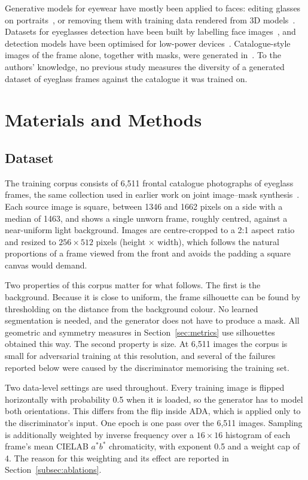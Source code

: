 \documentclass[electronics,article,submit,pdftex,moreauthors]{Definitions/mdpi}
\begin{document}
Generative models for eyewear have mostly been applied to faces: editing
glasses on portraits~\cite{plesh2023glassesgan}, or removing them with
training data rendered from 3D models~\cite{lyu2022portrait}. Datasets for
eyeglasses detection have been built by labelling face
images~\cite{matuzevicius2024diverse,matuzevicius2024retrospective}, and
detection models have been optimised for low-power
devices~\cite{giedra2025deploying}. Catalogue-style images of the frame
alone, together with masks, were generated
in~\cite{shubitidze2026masks}. To the authors' knowledge, no previous study
measures the diversity of a generated dataset of eyeglass frames against the
catalogue it was trained on.


\section{Materials and Methods}
\label{sec:methods}

\subsection{Dataset}
\label{subsec:data}

The training corpus consists of 6,511 frontal catalogue photographs of
eyeglass frames, the same collection used in earlier work on joint
image--mask synthesis~\cite{shubitidze2026masks}. Each source image is square,
between 1346 and 1662 pixels on a side with a median of 1463, and
shows a single unworn frame, roughly centred, against a near-uniform light
background. Images are centre-cropped
to a 2:1 aspect ratio and resized to $256 \times 512$ pixels (height $\times$
width), which follows the natural proportions of a frame viewed from the
front and avoids the padding a square canvas would demand.

Two properties of this corpus matter for what follows. The first is the
background. Because it is close to uniform, the frame silhouette can be found
by thresholding on the distance from the background colour. No learned
segmentation is needed, and the generator does not have to produce a mask.
All geometric and symmetry measures in Section~\ref{sec:metrics} use
silhouettes obtained this way. The second property is size. At 6,511 images
the corpus is small for adversarial training at this resolution, and several
of the failures reported below were caused by the discriminator memorising
the training set.

Two data-level settings are used throughout. Every training image is
flipped horizontally with probability 0.5 when it is loaded, so the generator
has to model both orientations. This differs from the flip inside ADA, which
is applied only to the discriminator's input. One epoch is one pass over the
6,511 images. Sampling is additionally weighted
by inverse frequency over a $16 \times 16$ histogram of each frame's mean
CIELAB $a^*b^*$ chromaticity, with exponent 0.5 and a weight cap of 4. The reason for this weighting and its effect are reported in
Section~\ref{subsec:ablations}.
\end{document}
